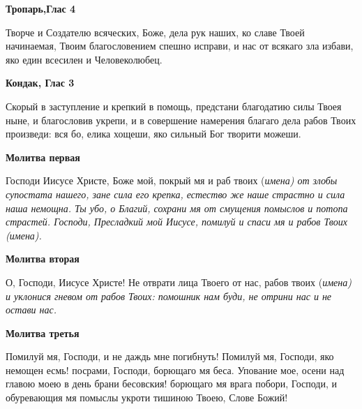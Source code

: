 

\label{_content_razlichnie_molitvi}

 

 


\bfseries Тропарь,Глас 4\normalfont{}\nopagebreak


Творче и Создателю всяческих, Боже, дела рук наших, ко славе Твоей начинаемая, Твоим благословением спешно исправи, и нас от всякаго зла избави, яко един всесилен и Человеколюбец.


\medskip


\bfseries Кондак, Глас 3\normalfont{}\nopagebreak


Скорый в заступление и крепкий в помощь, предстани благодатию силы Твоея ныне, и благословив укрепи, и в совершение намерения благаго дела рабов Твоих произведи: вся бо, елика хощеши, яко сильный Бог творити можеши. 
\nopagebreak\bigskip\bigskip\mychapterending

 


 \bfseries Молитва первая\normalfont{}


Господи Иисусе Христе, Боже мой, покрый мя и раб твоих (\itshape имена\normalfont{}) от злобы супостата нашего, зане сила его крепка, естество же наше страстно и сила наша немощна. Ты убо, о Благий, сохрани мя от смущения помыслов и потопа страстей. Господи, Пресладкий мой Иисусе, помилуй и спаси мя и рабов Твоих (\itshape имена\normalfont{}).


\medskip


 \bfseries Молитва вторая\normalfont{}


О, Господи, Иисусе Христе! Не отврати лица Твоего от нас, рабов твоих (\itshape имена\normalfont{}) и уклонися гневом от рабов Твоих: помошник нам буди, не отрини нас и не остави нас.


 \bfseries Молитва третья\normalfont{}


Помилуй мя, Господи, и не даждь мне погибнуть! Помилуй мя, Господи, яко немощен есмь! посрами, Господи, борющаго мя беса. Упование мое, осени над главою моею в день брани бесовския! борющаго мя врага побори, Господи, и обуревающия мя помыслы укроти тишиною Твоею, Слове Божий!


